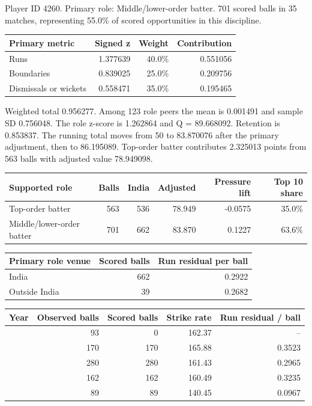 Player ID 4260. Primary role: Middle/lower-order batter. 701 scored balls in 35 matches, representing 55.0\% of scored opportunities in this discipline.

\begin{center}
\begin{tabularx}{\linewidth}{>{\raggedright\arraybackslash}Xrrr}
\toprule
Primary metric & Signed z & Weight & Contribution \\
\midrule
Runs & 1.377639 & 40.0\% & 0.551056 \\
Boundaries & 0.839025 & 25.0\% & 0.209756 \\
Dismissals or wickets & 0.558471 & 35.0\% & 0.195465 \\
\bottomrule
\end{tabularx}
\end{center}

Weighted total 0.956277. Among 123 role peers the mean is 0.001491 and sample SD 0.756048. The role z-score is 1.262864 and Q = 89.668092. Retention is 0.853837. The running total moves from 50 to 83.870076 after the primary adjustment, then to 86.195089. Top-order batter contributes 2.325013 points from 563 balls with adjusted value 78.949098.

\begin{center}
\begin{tabularx}{\linewidth}{>{\raggedright\arraybackslash}Xrrrrr}
\toprule
Supported role & Balls & India & Adjusted & Pressure lift & Top 10 share \\
\midrule
Top-order batter & 563 & 536 & 78.949 & -0.0575 & 35.0\% \\
Middle/lower-order batter & 701 & 662 & 83.870 & 0.1227 & 63.6\% \\
\bottomrule
\end{tabularx}
\end{center}

\begin{center}
\begin{tabularx}{\linewidth}{>{\raggedright\arraybackslash}Xrr}
\toprule
Primary role venue & Scored balls & Run residual per ball \\
\midrule
India & 662 & 0.2922 \\
Outside India & 39 & 0.2682 \\
\bottomrule
\end{tabularx}
\end{center}

\begin{center}
\begin{tabularx}{\linewidth}{>{\raggedright\arraybackslash}Xrrrr}
\toprule
Year & Observed balls & Scored balls & Strike rate & Run residual / ball \\
\midrule
2022 & 93 & 0 & 162.37 & -- \\
2023 & 170 & 170 & 165.88 & 0.3523 \\
2024 & 280 & 280 & 161.43 & 0.2965 \\
2025 & 162 & 162 & 160.49 & 0.3235 \\
2026 & 89 & 89 & 140.45 & 0.0967 \\
\bottomrule
\end{tabularx}
\end{center}

